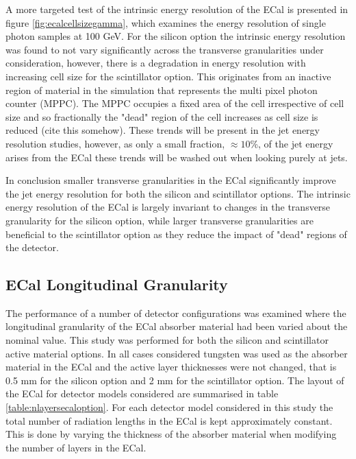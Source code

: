A more targeted test of the intrinsic energy resolution of the ECal is presented in figure \ref{fig:ecalcellsizegamma}, which examines the energy resolution of single photon samples at 100 GeV.  For the silicon option the intrinsic energy resolution was found to not vary significantly across the transverse granularities under consideration, however, there is a degradation in energy resolution with increasing cell size for the scintillator option.  This originates from an inactive region of material in the simulation that represents the multi pixel photon counter (MPPC).  The MPPC occupies a fixed area of the cell irrespective of cell size and so fractionally the "dead" region of the cell increases as cell size is reduced (cite this somehow).  These trends will be present in the jet energy resolution studies, however, as only a small fraction, $\approx 10$\%, of the jet energy arises from the ECal these trends will be washed out when looking purely at jets.

In conclusion smaller transverse granularities in the ECal significantly improve the jet energy resolution for both the silicon and scintillator options.  The intrinsic energy resolution of the ECal is largely invariant to changes in the transverse granularity for the silicon option, while larger transverse granularities are beneficial to the scintillator option as they reduce the impact of "dead" regions of the detector.  


\subsection{ECal Longitudinal Granularity}
\label{sec:ecalnlayers}
The performance of a number of detector configurations was examined where the longitudinal granularity of the ECal absorber material had been varied about the nominal value.  This study was performed for both the silicon and scintillator active material options.  In all cases considered tungsten was used as the absorber material in the ECal and the active layer thicknesses were not changed, that is 0.5 mm for the silicon option and 2 mm for the scintillator option.  The layout of the ECal for detector models considered are summarised in table \ref{table:nlayersecaloption}.  For each detector model considered in this study the total number of radiation lengths in the ECal is kept approximately constant.  This is done by varying the thickness of the absorber material when modifying the number of layers in the ECal. 

